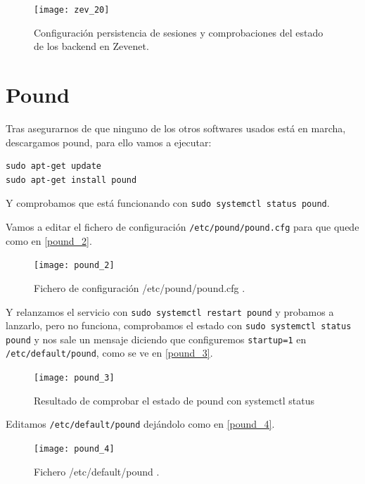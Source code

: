 \begin{figure}[h!]
\begin{center}
\caption{Configuración persistencia de sesiones y comprobaciones del estado de los backend en Zevenet.}
\label{zev_20}
\texttt{[image: zev\_20]}
\end{center}
\end{figure}

\chapter{Pound}

Tras asegurarnos de que ninguno de los otros softwares usados está en marcha, descargamos pound, para ello vamos a ejecutar:

\begin{verbatim}
sudo apt-get update
sudo apt-get install pound
\end{verbatim}

Y comprobamos que está funcionando con \verb|sudo systemctl status pound|.

Vamos a editar el fichero de configuración \verb|/etc/pound/pound.cfg| para que quede como en \eqref{pound_2}.

\begin{figure}[h!]
\begin{center}
\caption{Fichero de configuración /etc/pound/pound.cfg .}
\label{pound_2}
\texttt{[image: pound\_2]}
\end{center}
\end{figure}

Y relanzamos el servicio con \verb|sudo systemctl restart pound| y probamos a lanzarlo, pero no funciona, comprobamos el estado con \verb|sudo systemctl status pound| y nos sale un mensaje diciendo que configuremos \verb|startup=1| en \verb|/etc/default/pound|, como se ve en \eqref{pound_3}.

\begin{figure}[h!]
\begin{center}
\caption{Resultado de comprobar el estado de pound con systemctl status}
\label{pound_3}
\texttt{[image: pound\_3]}
\end{center}
\end{figure}

Editamos \verb|/etc/default/pound| dejándolo como en \eqref{pound_4}.

\begin{figure}[h!]
\begin{center}
\caption{Fichero /etc/default/pound .}
\label{pound_4}
\texttt{[image: pound\_4]}
\end{center}
\end{figure}

